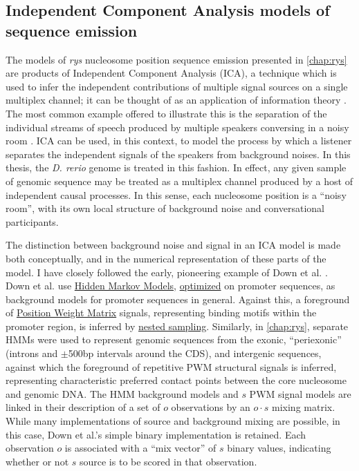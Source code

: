 \subsection{Independent Component Analysis models of sequence emission}
\label{ssec:ICA}
The models of \textit{rys} nucleosome position sequence emission presented in \autoref{chap:rys} are products of Independent Component Analysis (ICA), a technique which is used to infer the independent contributions of multiple signal sources on a single multiplex channel; it can be thought of as an application of information theory \cite{Lee2000}. The most common example offered to illustrate this is the separation of the individual streams of speech produced by multiple speakers conversing in a noisy room \cite{Jong-HwanLee2000}. ICA can be used, in this context, to model the process by which a listener separates the independent signals of the speakers from background noises. In this thesis, the \textit{D. rerio} genome is treated in this fashion. In effect, any given sample of genomic sequence may be treated as a multiplex channel produced by a host of independent causal processes. In this sense, each nucleosome position is a ``noisy room'', with its own local structure of background noise and conversational participants. 

The distinction between background noise and signal in an ICA model is made both conceptually, and in the numerical representation of these parts of the model. I have closely followed the early, pioneering example of Down et al. \cite{Down2005}. Down et al. use \hyperref[ssec:HMM]{Hidden Markov Models}, \hyperref[ssec:MLE]{optimized} on promoter sequences, as background models for promoter sequences in general. Against this, a foreground of \hyperref[ssec:PWM]{Position Weight Matrix} signals, representing binding motifs within the promoter region, is inferred by \hyperref[ssec:nested]{nested sampling}. Similarly, in \autoref{chap:rys}, separate HMMs were used to represent genomic sequences from the exonic, ``periexonic'' (introns and $\pm$500bp intervals around the CDS), and intergenic sequences, against which the foreground of repetitive PWM structural signals is inferred, representing characteristic preferred contact points between the core nucleosome and genomic DNA. The HMM background models and $s$ PWM signal models are linked in their description of a set of $o$ observations by an $o \cdot s$ mixing matrix. While many implementations of source and background mixing are possible, in this case, Down et al.'s simple binary implementation is retained. Each observation $o$ is associated with a ``mix vector'' of $s$ binary values, indicating whether or not $s$ source is to be scored in that observation.

